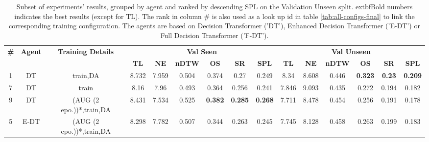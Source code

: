 \begin{table}
\centering
\caption{\label{tab:final}Subset of experiments' results, grouped by agent and ranked by descending SPL on the Validation Unseen split. 	extbf{Bold} numbers indicates the best results (except for TL). The rank in column \# is also used as a look up id in table \ref{tab:all-configs-final} to link the corresponding training configuration.     \newline The agents are based on Decision Transformer ('DT'), Enhanced Decision Transformer ('E-DT') or Full Decision Transformer ('F-DT').}
\begin{tabular}{@{\hskip3pt}c@{\hskip3pt}c@{\hskip3pt}c@{\hskip3pt}c@{\hskip3pt}c@{\hskip3pt}c@{\hskip3pt}c@{\hskip3pt}c@{\hskip3pt}c@{\hskip3pt}c@{\hskip3pt}c@{\hskip3pt}c@{\hskip3pt}c@{\hskip3pt}c@{\hskip3pt}c}
\toprule
\textbf{\#} & \textbf{Agent} & \textbf{Training Details} & \multicolumn{6}{c}{\textbf{Val Seen}} & \multicolumn{6}{c}{\textbf{Val Unseen}} \\
 \textbf{~} &     \textbf{~} &                \textbf{~} &       \textbf{TL} &    \textbf{NE} &   \textbf{nDTW} &     \textbf{OS} &     \textbf{SR} &    \textbf{SPL} &         \textbf{TL} &     \textbf{NE} &   \textbf{nDTW} &     \textbf{OS} &    \textbf{SR} &    \textbf{SPL} \\
\midrule
          1 &             DT &                  train,DA &             8.732 &          7.959 &           0.504 &           0.374 &            0.27 &           0.249 &                8.34 &           8.608 &           0.446 &  \textbf{0.323} &  \textbf{0.23} &  \textbf{0.209} \\
          7 &             DT &                     train &              8.16 &           7.96 &           0.493 &           0.364 &           0.256 &           0.241 &               7.846 &           9.093 &           0.435 &           0.272 &          0.194 &           0.182 \\
          9 &             DT &  (AUG (2 epo.))*,train,DA &             8.431 &          7.534 &           0.525 &  \textbf{0.382} &  \textbf{0.285} &  \textbf{0.268} &               7.711 &           8.478 &           0.454 &           0.256 &          0.191 &           0.178 \\
          5 &           E-DT &  (AUG (2 epo.))*,train,DA &             8.298 &          7.782 &           0.507 &           0.344 &           0.263 &           0.245 &               7.745 &           8.128 &           0.458 &           0.263 &          0.199 &           0.183 \\

\end{tabular}
\end{table}
